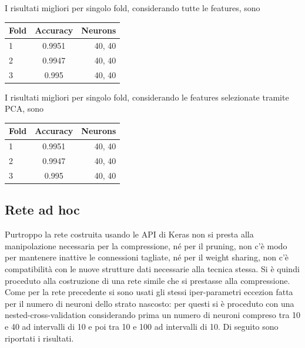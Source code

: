 \documentclass[12pt]{report}
\begin{document}
I risultati migliori per singolo fold, considerando tutte le features, sono

\par\null\par

\begin{center}
\begin{tabular}{lcr}
\toprule
Fold & Accuracy & Neurons \\
\midrule
1  & 0.9951 & 40, 40\\
2  & 0.9947 & 40, 40\\
3  & 0.995 & 40, 40\\
\bottomrule
\end{tabular}
\end{center}

\par\null\par
\par\null\par

I risultati migliori per singolo fold, considerando le features selezionate tramite PCA, sono

\par\null\par

\begin{center}
\begin{tabular}{lcr}
\toprule
Fold & Accuracy & Neurons \\
\midrule
1  & 0.9951 & 40, 40\\
2  & 0.9947 & 40, 40\\
3  & 0.995 & 40, 40\\
\bottomrule
\end{tabular}
\end{center}

\par\null\par
\par\null\par

\subsection{Rete ad hoc}
Purtroppo la rete costruita usando le API di Keras non si presta alla manipolazione necessaria per la compressione, né per il pruning, non c’è modo per mantenere inattive le connessioni tagliate, né per il weight sharing, non c’è compatibilità con le nuove strutture dati necessarie alla tecnica stessa.
Si è quindi proceduto alla costruzione di una rete simile che si prestasse alla compressione. Come per la rete precedente si sono usati gli stessi iper-parametri eccezion fatta per il numero di neuroni dello strato nascosto: per questi si è proceduto con una nested-cross-validation considerando prima un numero di neuroni compreso tra 10 e 40 ad intervalli di 10 e poi tra 10 e 100 ad intervalli di 10.
Di seguito sono riportati i risultati.
\end{document}
